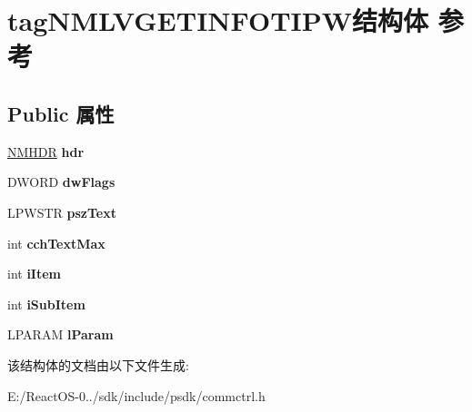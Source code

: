\hypertarget{structtag_n_m_l_v_g_e_t_i_n_f_o_t_i_p_w}{}\section{tag\+N\+M\+L\+V\+G\+E\+T\+I\+N\+F\+O\+T\+I\+P\+W结构体 参考}
\label{structtag_n_m_l_v_g_e_t_i_n_f_o_t_i_p_w}
\subsection*{Public 属性}
\begin{DoxyCompactItemize}
\item 
\mbox{\label{structtag_n_m_l_v_g_e_t_i_n_f_o_t_i_p_w_a62b53db8e4f977ed2ae2cb561e05067b}} 
\hyperlink{structtag_n_m_h_d_r}{N\+M\+H\+DR} {\bfseries hdr}
\item 
\mbox{\label{structtag_n_m_l_v_g_e_t_i_n_f_o_t_i_p_w_a70b7ecb8c6718223fe2c9d94d5ace71d}} 
D\+W\+O\+RD {\bfseries dw\+Flags}
\item 
\mbox{\label{structtag_n_m_l_v_g_e_t_i_n_f_o_t_i_p_w_a8043174453ba529d9e9c71bcae6c6962}} 
L\+P\+W\+S\+TR {\bfseries psz\+Text}
\item 
\mbox{\label{structtag_n_m_l_v_g_e_t_i_n_f_o_t_i_p_w_a92d20654ffa7cdca9d5db6e487332cf3}} 
int {\bfseries cch\+Text\+Max}
\item 
\mbox{\label{structtag_n_m_l_v_g_e_t_i_n_f_o_t_i_p_w_ad0c6e6767d76b116032836e72653eb51}} 
int {\bfseries i\+Item}
\item 
\mbox{\label{structtag_n_m_l_v_g_e_t_i_n_f_o_t_i_p_w_acbb81c2db4bea229ac63b502bbe8b79a}} 
int {\bfseries i\+Sub\+Item}
\item 
\mbox{\label{structtag_n_m_l_v_g_e_t_i_n_f_o_t_i_p_w_a7d391f87261a8a61bac6c7569930091e}} 
L\+P\+A\+R\+AM {\bfseries l\+Param}
\end{DoxyCompactItemize}


该结构体的文档由以下文件生成\+:\begin{DoxyCompactItemize}
\item 
E\+:/\+React\+O\+S-\/0../sdk/include/psdk/commctrl.\+h\end{DoxyCompactItemize}
